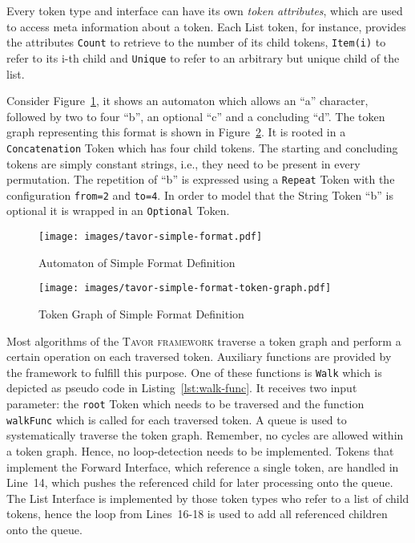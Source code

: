 Every token type and interface can have its own \textit{token attributes}, which are used to access meta information about a token. Each List token, for instance, provides the attributes \texttt{Count} to retrieve to the number of its child tokens, \texttt{Item(i)} to refer to its i-th child and \texttt{Unique} to refer to an arbitrary but unique child of the list.

Consider Figure~\ref{fig:automaton-simple-format}, it shows an automaton which allows an \enquote{a} character, followed by two to four \enquote{b}, an optional \enquote{c} and a concluding \enquote{d}. The token graph representing this format is shown in Figure~\ref{fig:token-graph-simple-format}. It is rooted in a \texttt{Concatenation} Token which has four child tokens. The starting and concluding tokens are simply constant strings, i.e., they need to be present in every permutation. The repetition of \enquote{b} is expressed using a \texttt{Repeat} Token with the configuration \texttt{from=2} and \texttt{to=4}. In order to model that the String Token \enquote{b} is optional it is wrapped in an \texttt{Optional} Token.

\begin{figure}
\begin{center}
\texttt{[image: images/tavor-simple-format.pdf]}
\caption{Automaton of Simple Format Definition}
\label{fig:automaton-simple-format}
\end{center}
\end{figure}

\begin{figure}[ht]
\texttt{[image: images/tavor-simple-format-token-graph.pdf]}
\caption{Token Graph of Simple Format Definition}
\label{fig:token-graph-simple-format}
\end{figure}

Most algorithms of the \textsc{Tavor framework} traverse a token graph and perform a certain operation on each traversed token. Auxiliary functions are provided by the framework to fulfill this purpose. One of these functions is \texttt{Walk} which is depicted as pseudo code in Listing~\ref{lst:walk-func}. It receives two input parameter: the \texttt{root} Token which needs to be traversed and the function \texttt{walkFunc} which is called for each traversed token. A queue is used to systematically traverse the token graph. Remember, no cycles are allowed within a token graph. Hence, no loop-detection needs to be implemented. Tokens that implement the Forward Interface, which reference a single token, are handled in Line~14, which pushes the referenced child for later processing onto the queue. The List Interface is implemented by those token types who refer to a list of child tokens, hence the loop from Lines~16-18 is used to add all referenced children onto the queue.

